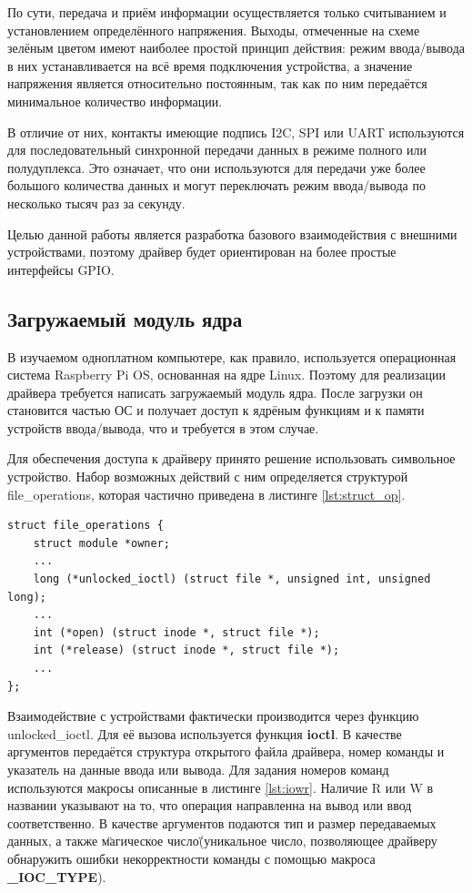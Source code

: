 По сути, передача и приём информации осуществляется только считыванием и установлением определённого напряжения. Выходы, отмеченные на схеме зелёным цветом имеют наиболее простой принцип действия: режим ввода/вывода в них устанавливается на всё время подключения устройства, а значение напряжения является относительно постоянным, так как по ним передаётся минимальное количество информации. 

В отличие от них, контакты имеющие подпись I2C, SPI или UART используются для последовательный синхронной передачи данных в режиме полного или полудуплекса. Это означает, что они используются для передачи уже более большого количества данных и могут переключать режим ввода/вывода по несколько тысяч раз за секунду. 

Целью данной работы является разработка базового взаимодействия с внешними устройствами, поэтому  драйвер будет ориентирован на более простые интерфейсы GPIO.

\subsection{Загружаемый модуль ядра}
В изучаемом одноплатном компьютере, как правило, используется операционная система Raspberry Pi OS, основанная на ядре Linux. Поэтому для реализации драйвера требуется написать загружаемый модуль ядра. После загрузки он становится частью ОС и получает доступ к ядрёным функциям и к памяти устройств ввода/вывода, что и требуется в этом случае. 

Для обеспечения доступа к драйверу принято решение использовать символьное устройство. Набор возможных действий с ним определяется структурой file\_operations, которая частично приведена в листинге \ref{lst:struct_op}.
\begin{lstlisting}[caption = {Структура file\_operations}, label=lst:struct_op]
struct file_operations {
	struct module *owner;
	...
	long (*unlocked_ioctl) (struct file *, unsigned int, unsigned long);
	...
	int (*open) (struct inode *, struct file *);
	int (*release) (struct inode *, struct file *);
	...
};
\end{lstlisting}

Взаимодействие с устройствами фактически производится через функцию unlocked\_ioctl. Для её вызова используется функция \textbf{ioctl}. В качестве аргументов передаётся структура открытого файла драйвера, номер команды и указатель на данные ввода или вывода. Для задания номеров команд используются макросы описанные в листинге \ref{lst:iowr}. Наличие R или W в названии указывают на то, что операция направленна на вывод или ввод соответственно. В качестве аргументов подаются тип и размер передаваемых данных, а также \"магическое число\" (уникальное число, позволяющее драйверу обнаружить ошибки некорректности команды с помощью макроса \textbf{\_IOC\_TYPE}).

